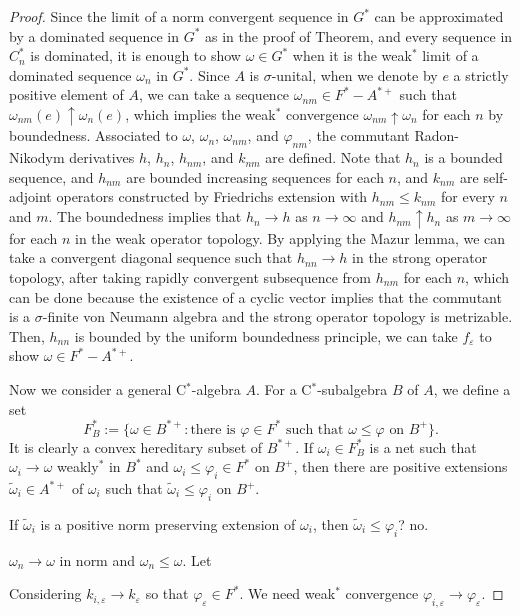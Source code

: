 \documentclass[a4paper]{amsart}
\newcommand{\e}{\varepsilon}
\theoremstyle{plain}
\theoremstyle{definition}
\begin{document}
\begin{proof}
Since the limit of a norm convergent sequence in $G^*$ can be approximated by a dominated sequence in $G^*$ as in the proof of Theorem, and every sequence in $C_n^*$ is dominated, it is enough to show $\omega\in G^*$ when it is the weak$^*$ limit of a dominated sequence $\omega_n$ in $G^*$.
Since $A$ is $\sigma$-unital, when we denote by $e$ a strictly positive element of $A$, we can take a sequence $\omega_{nm}\in F^*-A^{*+}$ such that $\omega_{nm}(e)\uparrow\omega_n(e)$, which implies the weak$^*$ convergence $\omega_{nm}\uparrow\omega_n$ for each $n$ by boundedness.
Associated to $\omega$, $\omega_n$, $\omega_{nm}$, and $\varphi_{nm}$, the commutant Radon-Nikodym derivatives $h$, $h_n$, $h_{nm}$, and $k_{nm}$ are defined.
Note that $h_n$ is a bounded sequence, and $h_{nm}$ are bounded increasing sequences for each $n$, and $k_{nm}$ are self-adjoint operators constructed by Friedrichs extension with $h_{nm}\le k_{nm}$ for every $n$ and $m$.
The boundedness implies that $h_n\to h$ as $n\to\infty$ and $h_{nm}\uparrow h_n$ as $m\to\infty$ for each $n$ in the weak operator topology.
By applying the Mazur lemma, we can take a convergent diagonal sequence such that $h_{nn}\to h$ in the strong operator topology, after taking rapidly convergent subsequence from $h_{nm}$ for each $n$, which can be done because the existence of a cyclic vector implies that the commutant is a $\sigma$-finite von Neumann algebra and the strong operator topology is metrizable.
Then, $h_{nn}$ is bounded by the uniform boundedness principle, we can take $f_\e$ to show $\omega\in F^*-A^{*+}$.



Now we consider a general C$^*$-algebra $A$.
For a C$^*$-subalgebra $B$ of $A$, we define a set
\[F_B^*:=\{\omega\in B^{*+}:\text{there is $\varphi\in F^*$ such that $\omega\le\varphi$ on $B^+$}\}.\]
It is clearly a convex hereditary subset of $B^{*+}$.
If $\omega_i\in F_B^*$ is a net such that $\omega_i\to\omega$ weakly$^*$ in $B^*$ and $\omega_i\le\varphi_i\in F^*$ on $B^+$, then there are positive extensions $\widetilde\omega_i\in A^{*+}$ of $\omega_i$ such that $\widetilde\omega_i\le\varphi_i$ on $B^+$.

If $\widetilde\omega_i$ is a positive norm preserving extension of $\omega_i$, then $\widetilde\omega_i\le\varphi_i$? no.


$\omega_n\to\omega$ in norm and $\omega_n\le\omega$.
Let 


Considering $k_{i,\e}\to k_\e$ so that $\varphi_\e\in F^*$.
We need weak$^*$ convergence $\varphi_{i,\e}\to\varphi_\e$.


\end{proof}
\end{document}

